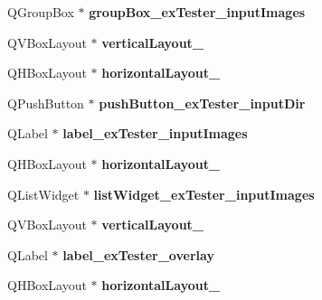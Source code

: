 \begin{DoxyCompactItemize}
\mbox{\label{class_ui___main_window_a3f3e6b440938bcc79c7d35ba6610f307}} 
Q\+Group\+Box $\ast$ {\bfseries group\+Box\+\_\+ex\+Tester\+\_\+input\+Images}
\item 
\mbox{\label{class_ui___main_window_a48f2e85b8eedbe1a445c899bb907e55c}} 
Q\+V\+Box\+Layout $\ast$ {\bfseries vertical\+Layout\+\_}
\item 
\mbox{\label{class_ui___main_window_a85691c679f9963970b66c42a90e376a6}} 
Q\+H\+Box\+Layout $\ast$ {\bfseries horizontal\+Layout\+\_}
\item 
\mbox{\label{class_ui___main_window_a7e014bb6ceefaca2a37a0a72e88b93e9}} 
Q\+Push\+Button $\ast$ {\bfseries push\+Button\+\_\+ex\+Tester\+\_\+input\+Dir}
\item 
\mbox{\label{class_ui___main_window_ab0bd8afca8126bfd8d76cab624623587}} 
Q\+Label $\ast$ {\bfseries label\+\_\+ex\+Tester\+\_\+input\+Images}
\item 
\mbox{\label{class_ui___main_window_aad3d8db37094128bce757e7de83b99c4}} 
Q\+H\+Box\+Layout $\ast$ {\bfseries horizontal\+Layout\+\_}
\item 
\mbox{\label{class_ui___main_window_a56c8a5ea7b309012cb0d86e8b24d82ff}} 
Q\+List\+Widget $\ast$ {\bfseries list\+Widget\+\_\+ex\+Tester\+\_\+input\+Images}
\item 
\mbox{\label{class_ui___main_window_acb6bddaaa42a951b7f0aeb448b743fdd}} 
Q\+V\+Box\+Layout $\ast$ {\bfseries vertical\+Layout\+\_}
\item 
\mbox{\label{class_ui___main_window_a35b3ba05b5b01c28197c1ddbe40b9b77}} 
Q\+Label $\ast$ {\bfseries label\+\_\+ex\+Tester\+\_\+overlay}
\item 
\mbox{\label{class_ui___main_window_a723fb7e81f06a2349d2616ea0f8763aa}} 
Q\+H\+Box\+Layout $\ast$ {\bfseries horizontal\+Layout\+\_}
\item 
\mbox{\label{class_ui___main_window_a1cfcc11f730f1d06705337aae2ce7b75}} 

\end{DoxyCompactItemize}

